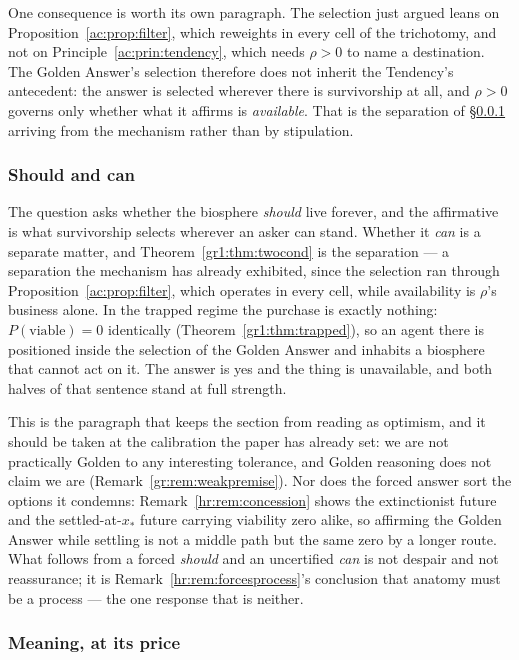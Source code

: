 \documentclass[11pt]{article}
\numberwithin{equation}{section}
\theoremstyle{plain}
\theoremstyle{definition}
\theoremstyle{remark}
\begin{document}
One consequence is worth its own paragraph. The selection just argued leans on Proposition~\ref{ac:prop:filter}, which reweights in every cell of the trichotomy, and not on Principle~\ref{ac:prin:tendency}, which needs $\rho > 0$ to name a destination. The Golden Answer's selection therefore does not inherit the Tendency's antecedent: the answer is selected wherever there is survivorship at all, and $\rho > 0$ governs only whether what it affirms is \emph{available}. That is the separation of \S\ref{ac:ssub:shouldcan} arriving from the mechanism rather than by stipulation.

\subsubsection{Should and can}\label{ac:ssub:shouldcan}

The question asks whether the biosphere \emph{should} live forever, and the affirmative is what survivorship selects wherever an asker can stand. Whether it \emph{can} is a separate matter, and Theorem~\ref{gr1:thm:twocond} is the separation --- a separation the mechanism has already exhibited, since the selection ran through Proposition~\ref{ac:prop:filter}, which operates in every cell, while availability is $\rho$'s business alone. In the trapped regime the purchase is exactly nothing: $P(\text{viable}) = 0$ identically (Theorem~\ref{gr1:thm:trapped}), so an agent there is positioned inside the selection of the Golden Answer and inhabits a biosphere that cannot act on it. The answer is yes and the thing is unavailable, and both halves of that sentence stand at full strength.

This is the paragraph that keeps the section from reading as optimism, and it should be taken at the calibration the paper has already set: we are not practically Golden to any interesting tolerance, and Golden reasoning does not claim we are (Remark~\ref{gr:rem:weakpremise}). Nor does the forced answer sort the options it condemns: Remark~\ref{hr:rem:concession} shows the extinctionist future and the settled-at-$x_\ast$ future carrying viability zero alike, so affirming the Golden Answer while settling is not a middle path but the same zero by a longer route. What follows from a forced \emph{should} and an uncertified \emph{can} is not despair and not reassurance; it is Remark~\ref{hr:rem:forcesprocess}'s conclusion that anatomy must be a process --- the one response that is neither.

\subsubsection{Meaning, at its price}\label{ac:ssub:meaning}
\end{document}

